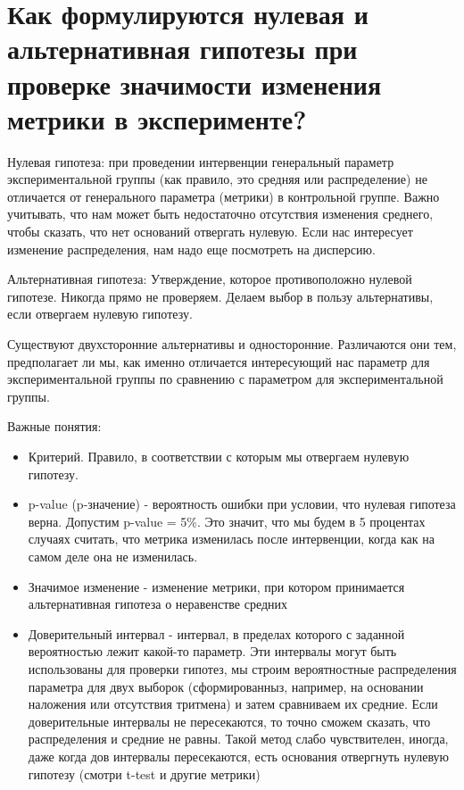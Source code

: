 \section{Как формулируются нулевая и альтернативная гипотезы при проверке значимости изменения метрики в эксперименте?}

Нулевая гипотеза: при проведении интервенции генеральный параметр экспериментальной группы (как правило, это средняя или распределение) не отличается от генерального параметра (метрики) в контрольной группе. Важно учитывать, что нам может быть недостаточно отсутствия изменения среднего, чтобы сказать, что нет оснований отвергать нулевую. Если нас интересует изменение распределения, нам надо еще посмотреть на дисперсию. 

Альтернативная гипотеза: Утверждение, которое противоположно нулевой гипотезе. Никогда прямо не проверяем. Делаем выбор в пользу альтернативы, если отвергаем нулевую гипотезу. 

Существуют двухсторонние альтернативы и односторонние. Различаются они тем, предполагает ли мы, как именно отличается интересующий нас параметр для экспериментальной группы по сравнению с параметром для экспериментальной группы. 

Важные понятия:

\begin{itemize}
    \item Критерий. Правило, в соответствии с которым мы отвергаем нулевую гипотезу. 
    \item p-value (p-значение) - вероятность ошибки при условии, что нулевая гипотеза верна. Допустим p-value = 5\%. Это значит, что мы будем в 5 процентах случаях считать, что метрика изменилась после интервенции, когда как на самом деле она не изменилась. 
    
    \item Значимое изменение - изменение метрики, при котором принимается альтернативная гипотеза о неравенстве средних
    \item Доверительный интервал - интервал, в пределах которого с заданной вероятностью лежит какой-то параметр. Эти интервалы могут быть использованы для проверки гипотез, мы строим вероятностные распределения параметра для двух выборок (сформированныз, например, на основании наложения или отсутствия тритмена) и затем сравниваем их средние. Если доверительные интервалы не пересекаются, то точно сможем сказать, что распределения и средние не равны. Такой метод слабо чувствителен, иногда, даже когда дов интервалы пересекаются, есть основания отвергнуть нулевую гипотезу (смотри t-test и другие метрики) 
\end{itemize}
